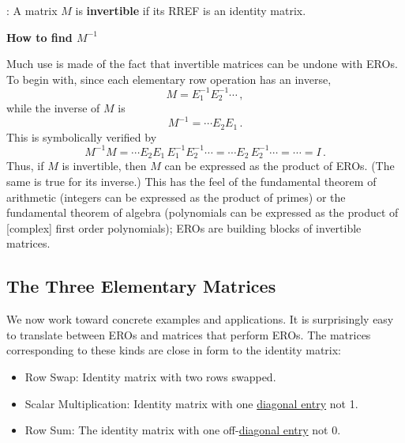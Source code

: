 : A matrix $M$ is {\bf invertible} if its RREF is an identity matrix.
\begin{center}
{\Large{\bf  How to find $M^{-1}$}}\\[5mm]
\end{center}

Much use is made of the fact that invertible matrices can be undone with EROs. 
To begin with, since each  elementary row operation has an inverse, 
\[
M= E_1^{-1} E_2^{-1} \cdots\, ,
\]
while the inverse of $M$ is 
\begin{equation*}
M^{-1}=\cdots E_2 E_1 \, .
\end{equation*}
This is symbolically verified by
\begin{equation*}
M^{-1}M=\cdots E_2 E_1\, E_1^{-1} E_2^{-1} \cdots
=\cdots E_2 \, E_2^{-1} \cdots = \cdots = I\, .
\end{equation*}
Thus, if $M$ is invertible, then  $M$  can be expressed as the product of EROs. (The same is true for its inverse.) This has the feel of the fundamental theorem of arithmetic (integers can be expressed as the product of primes) or the fundamental theorem of algebra (polynomials can be expressed as the product of [complex] first order polynomials); EROs are  building blocks of invertible matrices. 




\subsection{The Three Elementary Matrices}

We now work toward concrete examples and applications. 
It is surprisingly easy to translate between EROs and matrices that perform EROs.
The matrices corresponding to these kinds are close in form to the identity matrix:
\begin{itemize}
\item Row Swap: Identity matrix with two rows swapped.
\item Scalar Multiplication:  Identity matrix with one \hyperlink{diagmat}{diagonal entry} not 1.
\item Row Sum: The identity matrix with one off-\hyperlink{diagmat}{diagonal entry} not 0.
\end{itemize}


